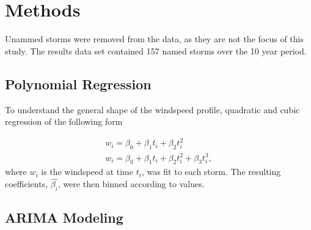 \documentclass{article}
\begin{document}
	\section{Methods}
	Unammed storms were removed from the data, as they are not the focus of this study. The results data set contained 157 named 
storms over the 10 year period.

	\subsection{Polynomial Regression}
	To understand the general shape of the windspeed profile, quadratic and cubic regression of the following form
	
		\begin{align}
			w_i = \beta_0 + \beta_1 t_i + \beta_2 t_i^2\\
			w_i = \beta_0 + \beta_1 t_i + \beta_2 t_i^2 + \beta_3 t_i^3,
		\end{align}
	where $w_i$ is the windspeed at time $t_i$, was fit to each storm. The resulting coefficients, $\hat{\beta_i}$, were then binned 
according to values.

	\subsection{ARIMA Modeling}


	
	
\end{document}
